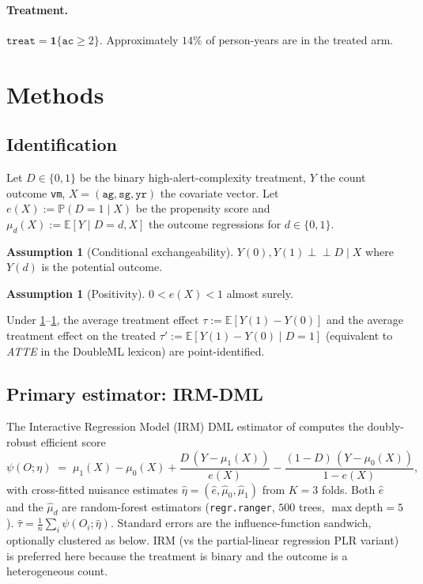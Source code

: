 \documentclass[11pt,a4paper]{article}
\providecommand{\coloneqq}{\mathrel{:=}}
\newcommand{\E}{\mathbb{E}}
\newcommand{\PP}{\mathbb{P}}
\newcommand{\1}{\mathbf{1}}
\newcommand{\indep}{\perp\!\!\!\perp}
\theoremstyle{plain}
\theoremstyle{definition}
\newtheorem{assumption}[theorem]{Assumption}
\begin{document}
\paragraph{Treatment.}
$\texttt{treat} = \1\{\texttt{ac}\ge 2\}$.  Approximately $14\%$ of
person-years are in the treated arm.

\section{Methods}\label{sec:methods}

\subsection{Identification}\label{sec:id}

Let $D \in \{0, 1\}$ be the binary high-alert-complexity treatment,
$Y$ the count outcome \texttt{vm}, $X = (\texttt{ag}, \texttt{sg},
\texttt{yr})$ the covariate vector.  Let $e(X) \coloneqq \PP(D=1\mid
X)$ be the propensity score and $\mu_d(X) \coloneqq \E[Y\mid D=d, X]$
the outcome regressions for $d\in\{0,1\}$.

\begin{assumption}[Conditional exchangeability]\label{ass:cex}
$Y(0), Y(1) \indep D \mid X$ where $Y(d)$ is the potential outcome.
\end{assumption}
\begin{assumption}[Positivity]\label{ass:pos}
$0 < e(X) < 1$ almost surely.
\end{assumption}

Under \ref{ass:cex}--\ref{ass:pos}, the average treatment effect
$\tau \coloneqq \E[Y(1) - Y(0)]$ and the average treatment effect on
the treated $\tau' \coloneqq \E[Y(1) - Y(0) \mid D=1]$ (equivalent
to \emph{ATTE} in the DoubleML lexicon) are point-identified.

\subsection{Primary estimator: IRM-DML}\label{sec:irm}

The Interactive Regression Model (IRM) DML estimator of
\cite{chernozhukov2018dml} computes the doubly-robust efficient
score
\begin{equation}\label{eq:irm-score}
  \psi(O; \eta)
  \;=\; \mu_1(X) - \mu_0(X)
       + \frac{D\,(Y - \mu_1(X))}{e(X)}
       - \frac{(1-D)\,(Y - \mu_0(X))}{1 - e(X)},
\end{equation}
with cross-fitted nuisance estimates $\hat\eta = (\hat e, \hat\mu_0,
\hat\mu_1)$ from $K=3$ folds.  Both $\hat e$ and the $\hat\mu_d$ are
random-forest estimators (\texttt{regr.ranger}, $500$ trees,
$\max\text{depth}=5$).  $\widehat\tau = \frac{1}{n}\sum_i
\psi(O_i;\hat\eta)$.  Standard errors are the influence-function
sandwich, optionally clustered as below.  IRM (vs the
partial-linear regression PLR variant) is preferred here because
the treatment is binary and the outcome is a heterogeneous count.
\end{document}
